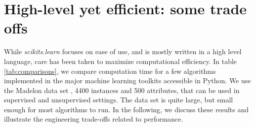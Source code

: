 \documentclass[twoside,11pt]{article}
\begin{document}
\section{High-level yet efficient: some trade offs}


While \emph{scikits.learn} focuses on ease of use, and is
mostly written in a high level language, care has been taken to maximize
computational efficiency. In table \ref{tab:comparisons}, we compare
computation time for a few algorithms implemented in the major machine
learning toolkits accessible in Python. We use the Madelon data
set \citep{Guyon2004}, 4400 instances and 500 attributes,
that can be used in supervised
and unsupervised settings.  The data set is quite large, but small enough for most
algorithms to run.
%
%
%
%
In the following, we discuss these results and illustrate
the engineering trade-offs related to performance.
\end{document}
